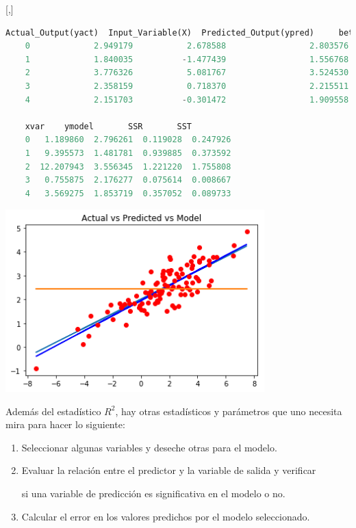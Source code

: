 [,]{}

\begin{lstlisting}[language=Python]
	Actual_Output(yact)  Input_Variable(X)  Predicted_Output(ypred)     betan  \
	0             2.949179           2.678588                 2.803576  0.543137
	1             1.840035          -1.477439                 1.556768  1.873530
	2             3.776326           5.081767                 3.524530  4.629773
	3             2.358159           0.718370                 2.215511  0.080941
	4             2.151703          -0.301472                 1.909558  0.565934
	
	xvar    ymodel       SSR       SST
	0   1.189860  2.796261  0.119028  0.247926
	1   9.395573  1.481781  0.939885  0.373592
	2  12.207943  3.556345  1.221220  1.755808
	3   0.755875  2.176277  0.075614  0.008667
	4   3.569275  1.853719  0.357052  0.089733
\end{lstlisting}


\begin{center}
	\includegraphics[width=10cm,keepaspectratio=true]{./images/optimalValue.png}
\end{center}



Además del estadístico $R^{2}$, hay otras estadísticos y parámetros que uno necesita
mira para hacer lo siguiente:


\begin{enumerate}
	\item Seleccionar algunas variables y deseche otras para el modelo.
	
	
	\item Evaluar la relación entre el predictor y la variable de salida y verificar
	
	
	si una variable de predicción es significativa en el modelo o no.
	\item Calcular el error en los valores predichos por el modelo seleccionado.
\end{enumerate}




